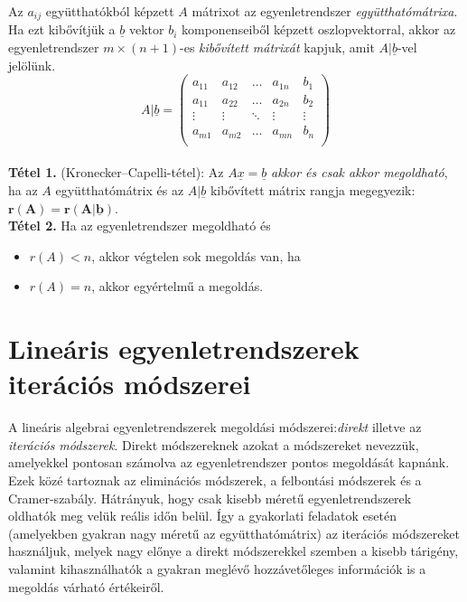 \documentclass[tikz,12pt,margin=0px]{article}
\begin{document}
    \noindent Az $a_{ij}$ együtthatókból képzett $A$ mátrixot az egyenletrendszer \emph{együtthatómátrixa}. Ha ezt kibővítjük a $\underline{b}$ vektor $b_{i}$ komponenseiből képzett oszlopvektorral, akkor az egyenletrendszer $m \times (n+1)$-es \emph{kibővített mátrixát} kapjuk, amit $A|\underline{b}$-vel jelölünk.\\
    \[
        A|\underline{b} = \left(
              \begin{array}{ccccc}
                a_{11} & a_{12} & \ldots & a_{1n} & b_{1} \\
                a_{11} & a_{22} & \ldots & a_{2n} & b_{2} \\
                \vdots & \vdots & \ddots & \vdots & \vdots \\
                a_{m1} & a_{m2} & \ldots & a_{mn} & b_{n} \\
              \end{array}
            \right)
    \]\\

    \noindent \textbf{Tétel 1.} (Kronecker–Capelli-tétel): Az $A\underline{x} = \underline{b}$ \emph{akkor és csak akkor megoldható}, ha az $A$ együtthatómátrix és az $A|\underline{b}$ kibővített mátrix rangja megegyezik: $\boldsymbol{r(A) = r(A|\underline{b})}$.\\

    \noindent \textbf{Tétel 2.} Ha az egyenletrendszer megoldható és
    \begin{itemize}
        \item $r(A) < n$, akkor végtelen sok megoldás van, ha
        \item $r(A)=n$, akkor egyértelmű a megoldás.
    \end{itemize}

	\section*{Lineáris egyenletrendszerek iterációs módszerei}

    \noindent A lineáris algebrai egyenletrendszerek megoldási módszerei:\emph{direkt} illetve az \emph{iterációs módszerek}. Direkt módszereknek azokat a módszereket nevezzük, amelyekkel pontosan számolva az egyenletrendszer pontos megoldását kapnánk. Ezek közé tartoznak az eliminációs módszerek, a felbontási módszerek és a Cramer-szabály. Hátrányuk, hogy csak kisebb méretű egyenletrendszerek oldhatók meg velük reális időn belül. Így a gyakorlati feladatok esetén (amelyekben gyakran nagy méretű az együtthatómátrix) az iterációs módszereket használjuk, melyek nagy előnye a direkt módszerekkel szemben a kisebb tárigény, valamint kihasználhatók a gyakran meglévő hozzávetőleges információk is a megoldás várható értékeiről.\\
\end{document}
